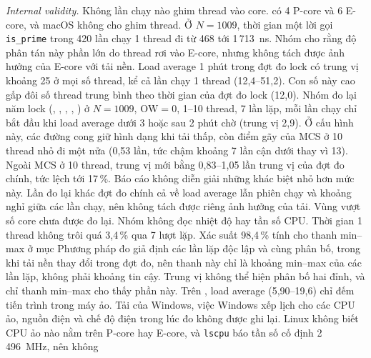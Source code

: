 \emph{Internal validity.} Không lần chạy nào ghim thread vào core.  có 4 P-core và 6
E-core, và macOS không cho ghim thread. Ở $N=1009$, thời gian một lời gọi \texttt{is\_prime} trong 420
lần chạy 1 thread đi từ 468 tới 1\,713~ns. Nhóm cho rằng độ phân tán này phần lớn do thread rơi vào
E-core, nhưng không tách được ảnh hưởng của E-core với tải nền. Load average 1 phút trong đợt đo lock
có trung vị khoảng 25 ở mọi số thread, kể cả lần chạy 1 thread (12,4--51,2). Con số này cao gấp đôi số
thread trung bình theo thời gian của đợt đo lock (12,0).
Nhóm đo lại năm lock (, , , ,
) ở $N = 1009$, $\mathrm{OW} = 0$, 1--10 thread, 7 lần lặp, mỗi lần chạy chỉ bắt
đầu khi load average dưới 3 hoặc sau 2 phút chờ (trung vị 2,9). Ở cấu hình này, các đường cong giữ hình
dạng khi tải thấp, còn điểm gãy của MCS ở 10 thread nhỏ đi một nửa (0,53 lần, tức chậm khoảng 7 lần
cận dưới thay vì 13). Ngoài MCS ở 10 thread, trung vị mới bằng 0,83--1,05 lần trung vị của đợt đo
chính, tức lệch tới 17\,\%. Báo cáo không diễn giải những khác biệt nhỏ hơn mức này. Lần đo lại khác
đợt đo chính cả về load average lẫn phiên chạy và khoảng nghỉ giữa các lần chạy, nên không tách được
riêng ảnh hưởng của tải. Vùng vượt số core chưa được đo lại.
Nhóm không đọc nhiệt độ hay tần số CPU. Thời gian 1 thread không trôi quá 3,4\,\% qua 7 lượt lặp.
Xác suất 98,4\,\% tính cho thanh min--max ở mục Phương pháp đo giả định các lần lặp độc lập và cùng
phân bố, trong khi tải nền thay đổi trong đợt đo, nên thanh này chỉ là khoảng min--max của các lần lặp,
không phải khoảng tin cậy. Trung vị không thể hiện phân bố hai đỉnh, và chỉ thanh min--max cho thấy phần
này.
Trên , load average (5,90--19,6) chỉ đếm tiến trình trong máy ảo. Tải của Windows, việc
Windows xếp lịch cho các CPU ảo, nguồn điện và chế độ điện trong lúc đo không được ghi lại. Linux không
biết CPU ảo nào nằm trên P-core hay E-core, và \texttt{lscpu} báo tần số cố định 2\,496~MHz, nên không
